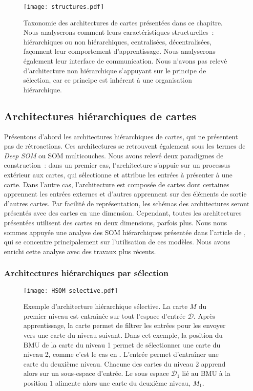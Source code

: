 \documentclass[../main]{subfiles}
\begin{document}
\begin{figure}
\centering\texttt{[image: structures.pdf]}
\caption{Taxonomie des architectures de cartes présentées dans ce chapitre. Nous analyserons comment leurs caractéristiques structurelles~: hiérarchiques ou non hiérarchiques, centralisées, décentralisées, façonnent leur comportement d'apprentissage. Nous analyserons également leur interface de communication. Nous n'avons pas relevé d'architecture non hiérarchique s'appuyant sur le principe de sélection, car ce principe est inhérent à une organisation hiérarchique. \label{fig:taxo}}
\end{figure}

\subsection{Architectures hiérarchiques de cartes}

Présentons d'abord les architectures hiérarchiques de cartes, qui ne présentent pas de rétroactions. Ces architectures se retrouvent également sous les termes de \emph{Deep SOM} ou SOM multicouches.
Nous avons relevé deux paradigmes de construction~: dans un premier cas, l'architecture s'appuie sur un processus extérieur aux cartes, qui sélectionne et attribue les entrées à présenter à une carte.
Dans l'autre cas, l'architecture est composée de cartes dont certaines apprennent les entrées externes et d'autres apprennent sur des éléments de sortie d'autres cartes.
Par facilité de représentation, les schémas des architectures seront présentés avec des cartes en une dimension. Cependant, toutes les architectures présentées utilisent des cartes en deux dimensions, parfois plus.
Nous nous sommes appuyée une analyse des SOM hiérarchiques présentée dans l'article de \cite{henriques_spatial_2012}, qui se concentre principalement sur l'utilisation de ces modèles.
Nous avons enrichi cette analyse avec des travaux plus récents.

\subsubsection{Architectures hiérarchiques par sélection}

\begin{figure}
    \texttt{[image: HSOM\_selective.pdf]}
    \caption{Exemple d'architecture hiérarchique sélective. La carte $M$ du premier niveau est entraînée sur tout l'espace d'entrée $\mathcal{D}$. Après apprentissage, la carte permet de filtrer les entrées pour les envoyer vers une carte du niveau suivant. Dans cet exemple, la position du BMU de la carte du niveau 1 permet de sélectionner une carte du niveau 2, comme c'est le cas en \cite{barbalho_hierarchical_2001}. 
    L'entrée permet d'entraîner une carte du deuxième niveau. Chacune des cartes du niveau 2 apprend alors sur un sous-espace d'entrée. Le sous espace $\mathcal{D}_1$ lié au BMU à la position $1$ alimente alors une carte du deuxième niveau, $M_1$.
    \label{fig:hsom_selective}}
\end{figure}
\end{document}
